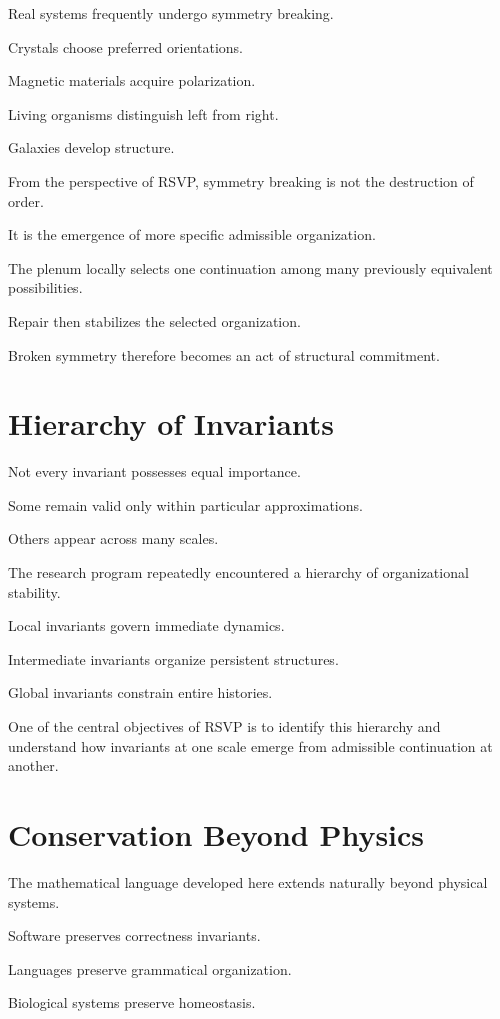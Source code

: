 \documentclass[11pt,oneside]{book}
\numberwithin{equation}{chapter}
\theoremstyle{definition}
\theoremstyle{plain}
\begin{document}
Real systems frequently undergo symmetry breaking.

Crystals choose preferred orientations.

Magnetic materials acquire polarization.

Living organisms distinguish left from right.

Galaxies develop structure.

From the perspective of RSVP, symmetry breaking is not the destruction of
order.

It is the emergence of more specific admissible organization.

The plenum locally selects one continuation among many previously
equivalent possibilities.

Repair then stabilizes the selected organization.

Broken symmetry therefore becomes an act of structural commitment.

\section{Hierarchy of Invariants}

Not every invariant possesses equal importance.

Some remain valid only within particular approximations.

Others appear across many scales.

The research program repeatedly encountered a hierarchy of organizational
stability.

Local invariants govern immediate dynamics.

Intermediate invariants organize persistent structures.

Global invariants constrain entire histories.

One of the central objectives of RSVP is to identify this hierarchy and
understand how invariants at one scale emerge from admissible continuation
at another.

\section{Conservation Beyond Physics}

The mathematical language developed here extends naturally beyond physical
systems.

Software preserves correctness invariants.

Languages preserve grammatical organization.

Biological systems preserve homeostasis.
\end{document}
